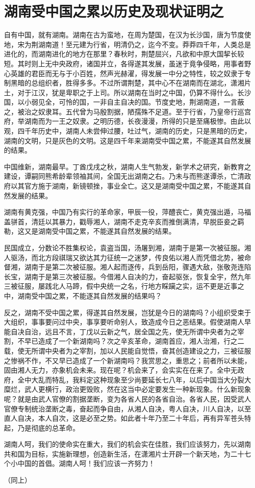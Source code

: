 \section{湖南受中国之累以历史及现状证明之}



自有中国，就有湖南。湖南在古为蛮地，在周为楚国，在汉为长沙国，唐为节度使地，宋为荆湖南道！至元建为行省，明清仍之，迄今不变。莽莽四千年，人类总是进化的，而湖南进化的地方在那里？春秋时，荆楚屈兴，凡欲和中原大国挈长较短。其时则上无中央政府，诸国并立，各得遂其发展，虽迷于竟争侵略，用事者野心英雄的君臣而无与于小百姓，然声光赫濯，得发展一中分之特性，较之奴隶于专制黑暗的总组织者，胜得多多。不过所谓荆楚，其中心不在湖南而在湖北，潇湘片土，对于江汉，犹是卑职之于上司。所以湖南在当时之中国，仍算不得什么。长沙国，以小弱见全，可怜的国，一非自主自决的国。节度史地，荆湖南道，一言蔽之，被治之奴隶耳。五代曾为马殷割据，陋孺殊不足道。至于行省，乃皇帝行巡宫府，举湖南而为一王之奴隶。之明历德，长夜漫漫，所得的只是至痛极惨。由此以观，四千年历史中，湖南人未尝伸过腰，吐过气，湖南的历史，只是黑暗的历史，湖南的文明，只是灰色的文明。这是四千年来湖南受中国之累，不能遂其自然发展的结果。

中国维新，湖南最早。丁酋戊戌之秋，湖南人生气勃发，新学术之研究，新教育之建设，谭嗣同熊希龄辈领袖其间，全国无出湖南之右。乃未与而熊遂谭杀，亡清政府以其官方施于湖南，新镜顿挫，事业全亡。这又是湖南受中国之累，不能遂其自然发展的结果。

湖南有黄克强，中国乃有实行的革命家，甲辰一役，萍醴丧亡，黄克强出遁，马福盖骈首，清廷以其暴力，戳辱湘人，湖南不走克辛亥而推倒满清，早脱臣妾之羁勒，这又是湖南受中国之累，不能遂其自然发展的结果。

民国成立，分数论不胜集权论，袁盗当国，汤屠到湘，湖南于是第一次被征服。湘人驱汤，而北方段祺瑞又欲达其力征统一之迷梦，传良佑以湘人而凭借北势，被命督湘，湖南于是第二次被征服。湘人起而逐传，兵到岳阳，骤遇大敌，张敬尧连陷长宝，湖南于是第三次被征服。今借湘人自决的力，奋起驱张，恢复全宇，然九年三被征服，屡践北人马蹄，假中央统一之名，行地方睬躏之实，运不更是近事之中，湖南受中国之累，不能逐其自然发展的结果吗？

反之，湖南不受中国之累，得遂其自然发展，岂犹是今日的湖南吗？小组织受束于大组织，事事要问过中央，事享要听命别人，致造成今日之恶结果。假使湖南人早能自决自治，远且不言，丁戊以云新之气，居全国之先，使无所谓中央者为之宰割，不早已造成了一个新湖南吗？次之辛亥革命，湖南首应，湘人治湘，行之二载，使无所谓中央者为之宰割，加以人民能自觉悟，奋其创造建设之力，三被征服之惨祸不作，不又早已造成了一个新湖南吗？我赏思之，重思之；前者所以未能，固由湘人无力，亦象机会未来。现在呢？机会来了，会实实在在来了。全中无政府，全中大乱而特乱，我料定这种现象至少尚要延长七八年，以后中国当大分裂大糜烂，武人更横行，政治更毁败，然在这当中必定要发生一种新现象。什么新现象呢？就是由武人官僚的割据垄断，变为各省人民的各省自治。各省人民，因受武人官僚专制统治垄断之毒，奋起而争自由，从湘人自决，粤人自决，川人自决，以至直人自决，本人自次，这是必至之势。如此者十年乃至二十年后，再有异军苍头特起，乃是彻底的总革命。

湖南人呵，我们的使命实在重大，我们的机会实在佳胜，我们应该努力，先以湖南共和国为目标，实施新理想，创造新生活，在潇湘片士开辟一个新天地，为二十七个小中国的首倡。湖南人呵！我们应该一齐努力！

（同上）

